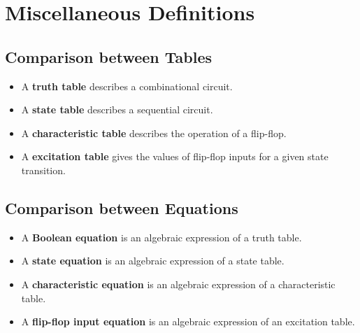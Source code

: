 \documentclass[a4paper]{article}
\begin{document}
\newpage
\section{Miscellaneous Definitions}
\subsection{Comparison between Tables}
\begin{itemize}
    \item A \textbf{truth table} describes a combinational circuit.
    \item A \textbf{state table} describes a sequential circuit.
    \item A \textbf{characteristic table} describes the operation of a flip-flop.
    \item A \textbf{excitation table} gives the values of flip-flop inputs for a given state transition.
\end{itemize}

\subsection{Comparison between Equations}
\begin{itemize}
    \item A \textbf{Boolean equation} is an algebraic expression of a truth table.
    \item A \textbf{state equation} is an algebraic expression of a state table.
    \item A \textbf{characteristic equation} is an algebraic expression of a characteristic table.
    \item A \textbf{flip-flop input equation} is an algebraic expression of an excitation table.
\end{itemize}
\end{document}
